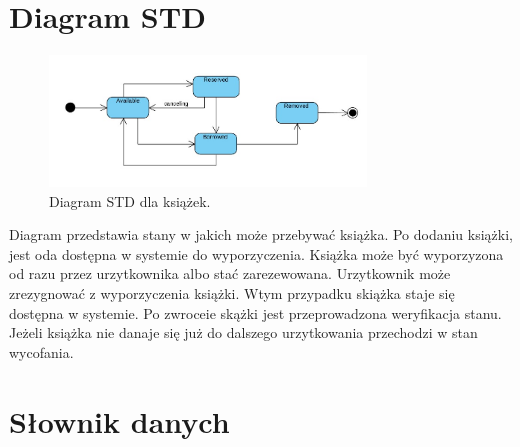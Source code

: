 \documentclass[12pt]{article}
\begin{document}
\newpage
\section{Diagram STD}
\begin{figure}[!h]
    \centering
    \includegraphics[width=0.75\textwidth]{Schemat_STD}
    \caption{Diagram STD dla książek.}
\end{figure}

Diagram przedstawia stany w jakich może przebywać książka. Po dodaniu książki, jest oda dostępna w systemie do wyporzyczenia. Książka może być wyporzyzona od razu przez urzytkownika albo stać zarezewowana. Urzytkownik może zrezygnować z wyporzyczenia książki. Wtym przypadku skiążka staje się dostępna w systemie. Po zwroceie skążki jest przeprowadzona weryfikacja stanu. Jeżeli książka nie danaje się już do dalszego urzytkowania przechodzi w stan wycofania.

\newpage
\section{Słownik danych}
\end{document}
